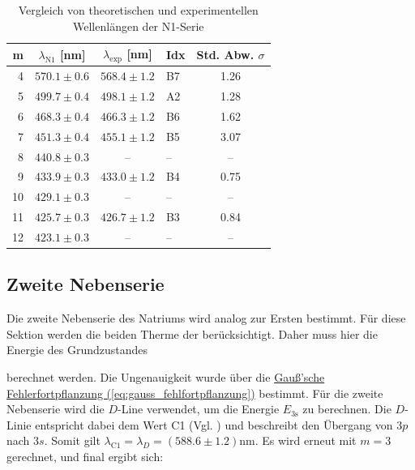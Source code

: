 \begin{table}[h!]
    \caption{Vergleich von theoretischen und experimentellen Wellenlängen der N1-Serie}
    \label{tab:n1_lambdas}
    \centering
    \begin{tabular}{r | c c | l || c}
        \toprule
        m & $\lambda_{\text{N1}}$ [nm] & $\lambda_{\text{exp}}$ [nm] & Idx & Std. Abw. $\sigma$ \\
        \midrule
        4 & $570.1 \pm 0.6$ & $568.4 \pm 1.2$ & B7 & 1.26 \\
        5 & $499.7 \pm 0.4$ & $498.1 \pm 1.2$ & A2 & 1.28 \\
        6 & $468.3 \pm 0.4$ & $466.3 \pm 1.2$ & B6 & 1.62 \\
        7 & $451.3 \pm 0.4$ & $455.1 \pm 1.2$ & B5 & 3.07 \\
        8 & $440.8 \pm 0.3$ & -- & -- & -- \\
        9 & $433.9 \pm 0.3$ & $433.0 \pm 1.2$ & B4 & 0.75 \\
        10 & $429.1 \pm 0.3$ & -- & -- & -- \\
        11 & $425.7 \pm 0.3$ & $426.7 \pm 1.2$ & B3 & 0.84 \\
        12 & $423.1 \pm 0.3$ & -- & -- & -- \\
        \bottomrule
    \end{tabular}
\end{table}

\subsection*{Zweite Nebenserie}
Die zweite Nebenserie des Natriums wird analog zur Ersten bestimmt. Für diese Sektion werden die beiden Therme der  berücksichtigt. Daher muss hier die Energie des Grundzustandes


berechnet werden. Die Ungenauigkeit wurde über die \hyperref[eq:gauss_fehlfortpflanzung]{Gauß'sche Fehlerfortpflanzung (\ref*{eq:gauss_fehlfortpflanzung})} bestimmt. Für die zweite Nebenserie wird die $D$-Line verwendet, um die Energie ${E_\text{3s}}$ zu berechnen. 
Die $D$-Linie entspricht dabei dem Wert C1 (Vgl. ) und beschreibt den Übergang von $3p$ nach $3s$. Somit gilt $\lambda_\text{C1} = \lambda_D = (588.6 \pm 1.2) \mathrm{nm}$. Es wird erneut mit $m=3$ gerechnet, und final ergibt sich:

